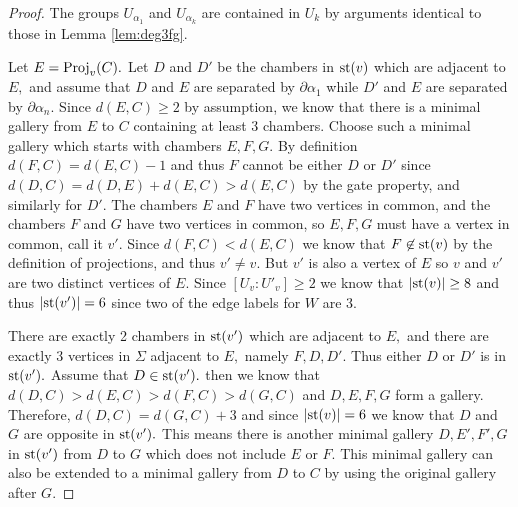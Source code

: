\documentclass[class=book, crop=false]{standalone}
\begin{document}
\begin{proof}
	The groups $U_{\alpha_1}$ and $U_{\alpha_k}$ are contained in $U_k$ by arguments identical to those in Lemma \ref{lem:deg3fg}.

	Let $E=\mathrm{Proj}_v(C).$ Let $D$ and $D'$ be the chambers in $\mathrm{st}(v)$ which are adjacent to $E,$ and assume that $D$ and $E$ are separated by $\partial\alpha_1$ while $D'$ and $E$ are separated by $\partial\alpha_n.$ Since $d(E,C)\ge 2$ by assumption, we know that there is a minimal gallery from $E$ to $C$ containing at least 3 chambers. Choose such a minimal gallery which starts with chambers $E,F,G.$ By definition $d(F,C)=d(E,C)-1$ and thus $F$ cannot be either $D$ or $D'$ since $d(D,C)=d(D,E)+d(E,C)>d(E,C)$ by the gate property, and similarly for $D'.$ The chambers $E$ and $F$ have two vertices in common, and the chambers $F$ and $G$ have two vertices in common, so $E,F,G$ must have a vertex in common, call it $v'.$ Since $d(F,C)<d(E,C)$ we know that $F\not\in \mathrm{st}(v)$ by the definition of projections, and thus $v'\neq v.$ But $v'$ is also a vertex of $E$ so $v$ and $v'$ are two distinct vertices of $E.$ Since $[U_v:U'_v]\ge 2$ we know that $|\mathrm{st}(v)|\ge 8$ and thus $|\mathrm{st}(v')|=6$ since two of the edge labels for $W$ are 3.

	There are exactly 2 chambers in $\mathrm{st}(v')$ which are adjacent to $E,$ and there are exactly 3 vertices in $\Sigma$ adjacent to $E,$ namely $F,D,D'.$ Thus either $D$ or $D'$ is in $\mathrm{st}(v').$ Assume that $D\in \mathrm{st}(v').$ then we know that $d(D,C)>d(E,C)>d(F,C)>d(G,C)$ and $D,E,F,G$ form a gallery. Therefore, $d(D,C)=d(G,C)+3$ and since $|\mathrm{st}(v)|=6$ we know that $D$ and $G$ are opposite in $\mathrm{st}(v').$ This means there is another minimal gallery $D,E',F',G$ in $\mathrm{st}(v')$ from $D$ to $G$ which does not include $E$ or $F.$ This minimal gallery can also be extended to a minimal gallery from $D$ to $C$ by using the original gallery after $G.$


\end{proof}
\end{document}
